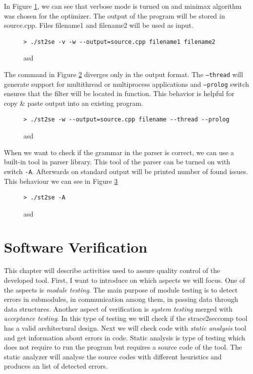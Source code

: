 In Figure \ref{exec/run1}, we can see that verbose mode is turned on and minimax
algorithm was chosen for the optimizer. The output of the program will be stored
in source.cpp. Files filename1 and filename2 will be used as input.

\begin{figure}[h]
	\lstset{style=npl}
\begin{lstlisting}
> ./st2se -v -w --output=source.cpp filename1 filename2
\end{lstlisting}
	\caption{asd}
	\label{exec/run1}
\end{figure}

The command in Figure \ref{exec/run2} diverges only in the output format. The
\texttt{--thread} will generate support for multithread or multiprocess applications and
\texttt{--prolog} switch ensures that the filter will be located in function. This
behavior is helpful for copy \& paste output into an existing program.

\begin{figure}[h]
	\lstset{style=npl}
\begin{lstlisting}
> ./st2se -w --output=source.cpp filename --thread --prolog
\end{lstlisting}
	\caption{asd}
	\label{exec/run2}
\end{figure}

When we want to check if the grammar in the parser is correct, we can use a
built-in tool in parser library. This tool of the parser can be turned on with
switch \texttt{-A}. Afterwards on standard output will be printed number of
found issues. This behaviour we can see in Figure \ref{exec/run3}

\begin{figure}[h]
	\lstset{style=npl}
\begin{lstlisting}
> ./st2se -A
\end{lstlisting}
	\caption{asd}
	\label{exec/run3}
\end{figure}

\chapter{Software Verification}
This chapter will describe activities used to assure quality control of the
developed tool. First, I want to introduce on which aspects we will focus. One
of the aspects is \textit{module testing}. The main purpose of module testing is
to detect errors in submodules, in communication among them, in passing data
through data structures. Another aspect of verification is \textit{system
testing} merged with \textit{acceptance testing}. In this type of testing we
will check if the strace2seccomp tool has a valid architectural design. Next we
will check code with \textit{static analysis} tool and get information about
errors in code. Static analysis is type of testing which does not require to run
the program but requires a source code of the tool. The static analyzer will
analyse the source codes with different heuristics and produces an list of
detected errors.


